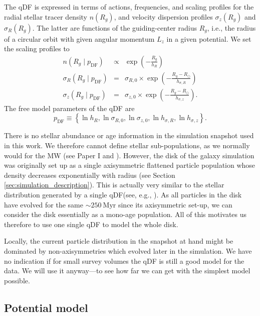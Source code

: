 \documentclass[iop,revtex4,numberedappendix,appendixfloats]{emulateapj}
\begin{document}
The qDF is expressed in terms of actions, frequencies, and scaling profiles for the radial stellar tracer density $n(R_g)$, and velocity dispersion profiles $\sigma_z(R_g)$ and $\sigma_R(R_g)$. The latter are functions of the guiding-center radius $R_g$, i.e., the radius of a circular orbit with given angular momentum $L_z$ in a given potential. We set the scaling profiles to
\begin{eqnarray}
n(R_g \mid p_\text{DF}) &\propto& \exp\left(-\frac{R_g}{h_R} \right)\\
\sigma_R(R_g \mid p_\text{DF}) &=& \sigma_{R,0} \times \exp\left(- \frac{R_g-R_\odot}{h_{\sigma,R}} \right)\label{eq:sigmaRRg}\\
\sigma_z(R_g \mid p_\text{DF}) &=& \sigma_{z,0} \times \exp\left(- \frac{R_g-R_\odot}{h_{\sigma,z}} \right)\label{eq:sigmazRg}.
\end{eqnarray}
The free model parameters of the qDF are
\begin{equation}
p_\text{DF} \equiv \left\{ \ln h_R, \ln \sigma_{R,0}, \ln \sigma_{z,0}, \ln h_{\sigma,R}, \ln h_{\sigma,z}\right\}. \label{eq:qDF_parameters}
\end{equation}

There is no stellar abundance or age information in the simulation snapshot used in this work. We therefore cannot define stellar sub-populations, as we normally would for the MW (see Paper I and \citealt{2013ApJ...779..115B}). However, the disk of the galaxy simulation was originally set up as a single axisymmetric flattened particle population whose density decreases exponentially with radius (see Section \ref{sec:simulation_description}). This is actually very similar to the stellar distribution generated by a single qDF(see, e.g., \citealt{2013MNRAS.434..652T}). As all particles in the disk have evolved for the same $\sim 250~\text{Myr}$ since its axisymmetric set-up, we can consider the disk essentially as a mono-age population. All of this motivates us therefore to use one single qDF to model the whole disk.

Locally, the current particle distribution in the snapshot at hand might be dominated by non-axisymmetries which evolved later in the simulation. We have no indication if for small survey volumes the qDF is still a good model for the data. We will use it anyway---to see how far we can get with the simplest model possible.

\subsection{Potential model} \label{sec:potential_model}
\end{document}
